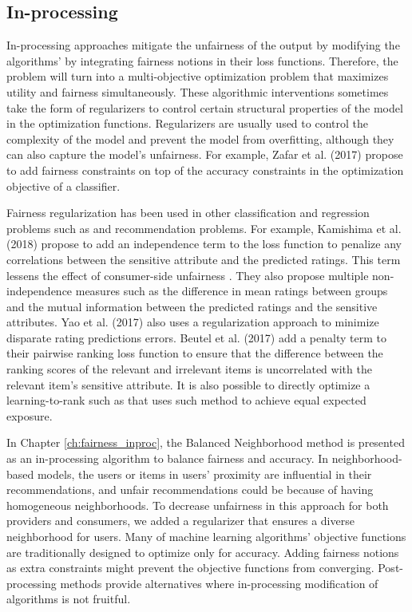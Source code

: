     \subsection{In-processing}

        In-processing approaches mitigate the unfairness of the output by modifying the algorithms' by integrating fairness notions in their loss functions. Therefore, the problem will turn into a multi-objective optimization problem that maximizes utility and fairness simultaneously. These algorithmic interventions sometimes take the form of regularizers to control certain structural properties of the model in the optimization functions. Regularizers are usually used to control the complexity of the model and prevent the model from overfitting, although they can also capture the model's unfairness. For example, Zafar et al. (2017) \cite{zafar2017fairness} propose to add fairness constraints on top of the accuracy constraints in the optimization objective of a classifier. 
        
        Fairness regularization has been used in other classification and regression problems such as \cite{kamishima2012fairness,berk2017convex} and recommendation problems. For example, Kamishima et al. (2018) \cite{kamishima2018recommendation,kamishima-} propose to add an independence term to the loss function to penalize any correlations between the sensitive attribute and the predicted ratings. This term lessens the effect of consumer-side unfairness \cite{kamishima2017considerations}. They also propose multiple non-independence measures such as the difference in mean ratings between groups and the mutual information between the predicted ratings and the sensitive attributes. Yao et al. (2017) \cite{yao_huang_fatml-2017} also uses a regularization approach to minimize disparate rating predictions errors. Beutel et al. (2017) \cite{beutel2017data} add a penalty term to their pairwise ranking loss function to ensure that the difference between the ranking scores of the relevant and irrelevant items is uncorrelated with the relevant item's sensitive attribute. It is also possible to directly optimize a learning-to-rank such as \cite{diaz2020} that uses such method to achieve equal expected exposure.

        In Chapter \ref{ch:fairness_inproc}, the Balanced Neighborhood method is presented as an in-processing algorithm to balance fairness and accuracy. In neighborhood-based models, the users or items in users' proximity are influential in their recommendations, and unfair recommendations could be because of having homogeneous neighborhoods. To decrease unfairness in this approach for both providers and consumers, we added a regularizer that ensures a diverse neighborhood for users. Many of machine learning algorithms' objective functions are traditionally designed to optimize only for accuracy. Adding fairness notions as extra constraints might prevent the objective functions from converging. Post-processing methods provide alternatives where in-processing modification of algorithms is not fruitful.

